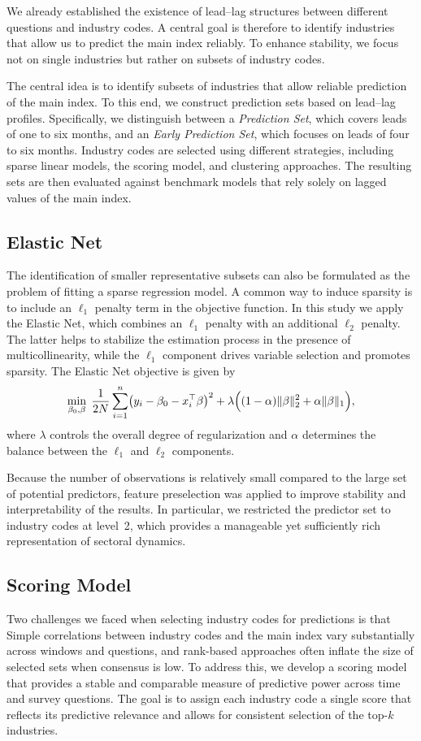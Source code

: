 We already established the existence of lead--lag structures between different questions and industry codes. A central goal is therefore to identify industries that allow us to predict the main index reliably. To enhance stability, we focus not on single industries but rather on subsets of industry codes.

The central idea is to identify subsets of industries that allow reliable prediction of the main index. To this end, we construct prediction sets based on lead--lag profiles. Specifically, we distinguish between a \emph{Prediction Set}, which covers leads of one to six months, and an \emph{Early Prediction Set}, which focuses on leads of four to six months. Industry codes are selected using different strategies, including sparse linear models, the scoring model, and clustering approaches. The resulting sets are then evaluated against benchmark models that rely solely on lagged values of the main index.

\subsection{Elastic Net}
The identification of smaller representative subsets can also be formulated as the problem of fitting a sparse regression model. A common way to induce sparsity is to include an $\ell_1$ penalty term in the objective function. In this study we apply the Elastic Net, which combines an $\ell_1$ penalty with an additional $\ell_2$ penalty. The latter helps to stabilize the estimation process in the presence of multicollinearity, while the $\ell_1$ component drives variable selection and promotes sparsity. The Elastic Net objective is given by
\[
\min_{\beta_0,\beta}\;\frac{1}{2N}\sum_{i=1}^n\bigl(y_i-\beta_0-x_i^\top\beta\bigr)^2+\lambda\Bigl((1-\alpha)\lVert\beta\rVert_2^2+\alpha\lVert\beta\rVert_1\Bigr),
\]
where $\lambda$ controls the overall degree of regularization and $\alpha$ determines the balance between the $\ell_1$ and $\ell_2$ components.  

Because the number of observations is relatively small compared to the large set of potential predictors, feature preselection was applied to improve stability and interpretability of the results. In particular, we restricted the predictor set to industry codes at level~2, which provides a manageable yet sufficiently rich representation of sectoral dynamics.

\subsection{Scoring Model}
Two challenges we faced when selecting industry codes for predictions is that 
Simple correlations between industry codes and the main index vary substantially across windows and questions, and rank-based approaches often inflate the size of selected sets when consensus is low. To address this, we develop a scoring model that provides a stable and comparable measure of predictive power across time and survey questions. The goal is to assign each industry code a single score that reflects its predictive relevance and allows for consistent selection of the top-$k$ industries.

